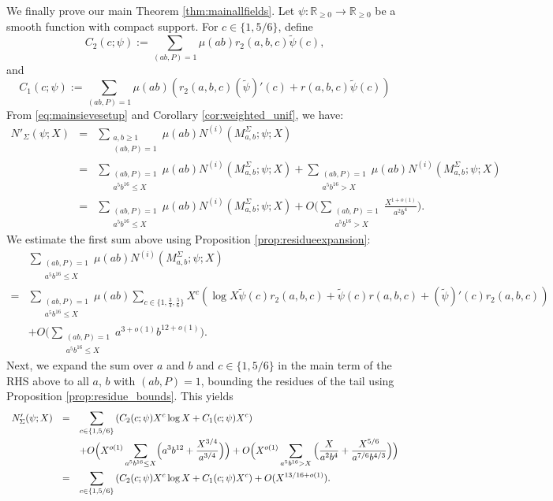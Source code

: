 \documentclass{article}
\def\R{{\mathbb R}}
\begin{document}
We finally prove our main Theorem \ref{thm:mainallfields}. Let $\psi:\R_{\geq 0}\to\R_{\geq 0}$ be a smooth function with compact support. For $c\in\{1,5/6\}$, define
$$C_2(c;\psi):=\sum_{(ab,P)=1}\mu(ab) r_2(a,b,c)\tilde{\psi}(c),$$
and
$$C_1(c;\psi):=\sum_{(ab,P)=1}\mu(ab)\left( r_2(a,b,c)(\tilde{\psi})'(c) + r(a,b,c)\tilde{\psi}(c)\right)$$
From \eqref{eq:mainsievesetup} and Corollary \ref{cor:weighted_unif}, we have:
\begin{equation*}
\begin{array}{rcl}
N'_\Sigma(\psi;X) &=& \displaystyle\sum_{\substack{a,b\geq 1\\(ab,P)=1}}\mu(ab)N^{(i)}(M_{a,b}^\Sigma;\psi;X)
\\[.2in]&=&\displaystyle
\sum_{\substack{(ab,P)=1\\a^5b^{16}\leq X}}\mu(ab)N^{(i)}(M_{a,b}^\Sigma;\psi;X)+
\sum_{\substack{(ab,P)=1\\a^5b^{16}> X}}\mu(ab)N^{(i)}(M_{a,b}^\Sigma;\psi;X)
\\[.2in]&=&\displaystyle
\sum_{\substack{(ab,P)=1\\a^5b^{16}\leq X}}\mu(ab)N^{(i)}(M_{a,b}^\Sigma;\psi;X)+
O\Big(
\sum_{\substack{(ab,P)=1\\a^5b^{16}> X}}\frac{X^{1+o(1)}}{a^2b^4}
\Big).
\end{array}
\end{equation*}
We estimate the first sum above using Proposition \ref{prop:residueexpansion}:
\begin{equation*}
\begin{array}{rl}
&\displaystyle
\sum_{\substack{(ab,P)=1\\a^5b^{16}\leq X}}\mu(ab)N^{(i)}(M_{a,b}^\Sigma;\psi;X) \\[.12in]
=& \displaystyle
\sum_{\substack{(ab,P)=1\\a^5b^{16}\leq X}}\mu(ab)
\sum_{c\in \{1,\frac34,\frac56\}}X^c\left(\log X\tilde{\psi}(c)r_2(a,b,c)+\tilde{\psi}(c)r(a,b,c)+(\tilde{\psi})'(c)r_2(a,b,c) \right)
\\[.25in]
&\displaystyle +O\Big(
\sum_{\substack{(ab,P)=1\\a^5b^{16}\leq X}}a^{3+o(1)}b^{12+o(1)}
\Big).
\end{array}
\end{equation*}
Next, we expand the sum over $a$ and $b$ and $c\in\{1,5/6\}$ in the main term of the RHS above to all $a$, $b$ with $(ab,P)=1$, bounding the residues of the tail using Proposition \ref{prop:residue_bounds}. This yields
\begin{equation}\label{eq:inclusion_exclusion_final}
\begin{array}{rcl}
N'_\Sigma(\psi;X)&=&\displaystyle
\sum_{c\in\{1,5/6\}} \left( C_2(c;\psi)X^c\log X +C_1(c;\psi)X^c  \right)
\\[.2in]&&\displaystyle +
O\Bigl(X^{o(1)}
\sum_{a^5b^{16}\leq X}\Bigl(a^{3}b^{12}+\frac{X^{3/4}}{a^{3/4}}\Bigr)
\Bigr) +O\Bigl(
X^{o(1)}\sum_{a^5b^{16}> X}\Big(\frac{X}{a^2b^4}+\frac{X^{5/6}}{a^{7/6}b^{4/3}}
\Bigr)\Big)
\\[.2in]&=&\displaystyle
\sum_{c\in\{1,5/6\}} \left( C_2(c;\psi)X^c\log X +C_1(c;\psi)X^c  \right)+O(X^{13/16+o(1)}).
\end{array}
\end{equation}
\end{document}
